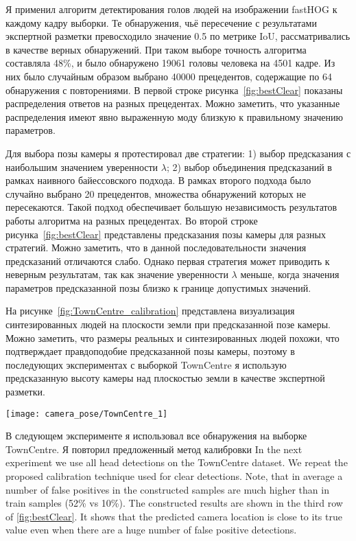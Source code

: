 Я применил алгоритм детектирования голов людей на изображении fastHOG \cite{prisacariu2009fasthog} к каждому кадру выборки. Те обнаружения, чьё пересечение с результатами экспертной разметки превосходило значение 0.5 по метрике IoU, рассматривались в качестве верных обнаружений. При таком выборе точность алгоритма составляла 48\%, и было обнаружено 19061 головы человека на 4501 кадре. Из них было случайным образом выбрано 40000 прецедентов, содержащие по 64 обнаружения с повторениями. В первой строке рисунка~\ref{fig:bestClear} показаны распределения ответов на разных прецедентах. Можно заметить, что указанные распределения имеют явно выраженную моду близкую к правильному значению параметров.

Для выбора позы камеры я протестировал две стратегии: 1) выбор предсказания с наибольшим значением уверенности $\lambda$; 2) выбор объединения предсказаний в рамках наивного байессовского подхода. В рамках второго подхода было случайно выбрано 20 прецедентов, множества обнаружений которых не пересекаются. Такой подход обеспечивает большую независимость результатов работы алгоритма на разных прецедентах. Во второй строке рисунка~\ref{fig:bestClear} представлены предсказания позы камеры для разных стратегий. Можно заметить, что в данной последовательности значения предсказаний отличаются слабо. Однако первая стратегия может приводить к неверным результатам, так как значение уверенности $\lambda$ меньше, когда значения параметров предсказанной позы близко к границе допустимых значений.

На рисунке~\ref{fig:TownCentre_calibration} представлена визуализация синтезированных людей на плоскости земли при предсказанной позе камеры. Можно заметить, что размеры реальных и синтезированных людей похожи, что подтверждает правдоподобие предсказанной позы камеры, поэтому в последующих экспериментах с выборкой TownCentre я использую предсказанную высоту камеры над плоскостью земли в качестве экспертной разметки.

\begin{figure*}[!t]
	\centering
	\texttt{[image: camera\_pose/TownCentre\_1]}
	\caption{Визуализация синтезированных людей на предсказанной плоскости земли.}
	\label{fig:TownCentre_calibration}
\end{figure*}

В следующем эксперименте я использовал все обнаружения на выборке TownCentre. Я повторил предложенный метод калибровки
In the next experiment we use all head detections on the TownCentre dataset. We repeat the proposed calibration technique used for clear detections. Note, that in average a number of false positives in the constructed samples are much higher than in train samples (52\% vs 10\%). The constructed results are shown in the third row of \ref{fig:bestClear}. It shows that the predicted camera location is close to its true value even when there are a huge number of false positive detections.

